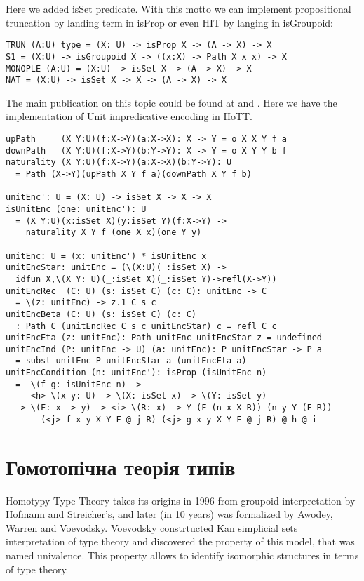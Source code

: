 Here we added isSet predicate. With this motto we can implement propositional
truncation by landing term in isProp or even HIT by langing in isGroupoid:

\begin{lstlisting}[mathescape=true]
TRUN (A:U) type = (X: U) -> isProp X -> (A -> X) -> X
S1 = (X:U) -> isGroupoid X -> ((x:X) -> Path X x x) -> X
MONOPLE (A:U) = (X:U) -> isSet X -> (A -> X) -> X
NAT = (X:U) -> isSet X -> X -> (A -> X) -> X
\end{lstlisting}

The main publication on this topic could be found at \cite{Awodey17} and \cite{Speight17}.
Here we have the implementation of Unit impredicative encoding in HoTT.

\begin{lstlisting}[mathescape=true]
upPath     (X Y:U)(f:X->Y)(a:X->X): X -> Y = o X X Y f a
downPath   (X Y:U)(f:X->Y)(b:Y->Y): X -> Y = o X Y Y b f
naturality (X Y:U)(f:X->Y)(a:X->X)(b:Y->Y): U
  = Path (X->Y)(upPath X Y f a)(downPath X Y f b)

unitEnc': U = (X: U) -> isSet X -> X -> X
isUnitEnc (one: unitEnc'): U
  = (X Y:U)(x:isSet X)(y:isSet Y)(f:X->Y) ->
    naturality X Y f (one X x)(one Y y)

unitEnc: U = (x: unitEnc') * isUnitEnc x
unitEncStar: unitEnc = (\(X:U)(_:isSet X) ->
  idfun X,\(X Y: U)(_:isSet X)(_:isSet Y)->refl(X->Y))
unitEncRec  (C: U) (s: isSet C) (c: C): unitEnc -> C
  = \(z: unitEnc) -> z.1 C s c
unitEncBeta (C: U) (s: isSet C) (c: C)
  : Path C (unitEncRec C s c unitEncStar) c = refl C c
unitEncEta (z: unitEnc): Path unitEnc unitEncStar z = undefined
unitEncInd (P: unitEnc -> U) (a: unitEnc): P unitEncStar -> P a
  = subst unitEnc P unitEncStar a (unitEncEta a)
unitEncCondition (n: unitEnc'): isProp (isUnitEnc n)
  =  \(f g: isUnitEnc n) ->
     <h> \(x y: U) -> \(X: isSet x) -> \(Y: isSet y)
  -> \(F: x -> y) -> <i> \(R: x) -> Y (F (n x X R)) (n y Y (F R))
       (<j> f x y X Y F @ j R) (<j> g x y X Y F @ j R) @ h @ i
\end{lstlisting}

\section{Гомотопічна теорія типів}

Homotypy Type Theory takes its origins in 1996 from groupoid interpretation by
Hofmann and Streicher's, and later (in 10 years) was formalized by Awodey,
Warren and Voevodsky. Voevodsky constrtucted Kan simplicial sets interpretation
of type theory and discovered the property of this model, that was named univalence.
This property allows to identify isomorphic structures in terms of type theory.

